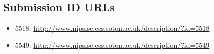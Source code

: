 \documentclass{ecsarticle}     %
\begin{document}
\backmatter
\begin{appendix}

\newpage


\section{Submission ID URLs}
\label{sec:id}
\begin{itemize}
	\item 5518: \href{http://www.nipsfsc.ecs.soton.ac.uk/description/?id=5518}{http://www.nipsfsc.ecs.soton.ac.uk/description/?id=5518}
	\item 5549: \href{http://www.nipsfsc.ecs.soton.ac.uk/description/?id=5549}{http://www.nipsfsc.ecs.soton.ac.uk/description/?id=5549}
\end{itemize}





\end{appendix}
\end{document}
